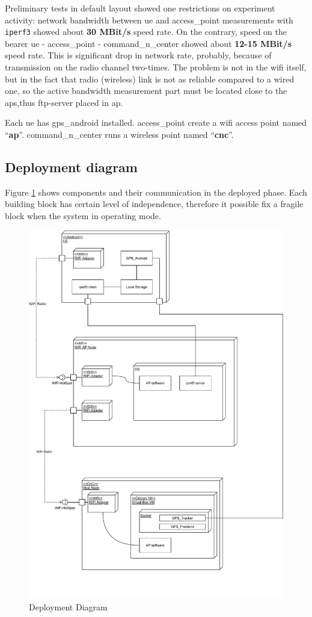 Preliminary tests in default layout showed one restrictions on experiment activity: network bandwidth
between \gls{ue} and \acrshort{access_point} measurements with \texttt{iperf3} showed about \textbf{30 MBit/s} speed rate. On the contrary, speed on the bearer \gls{ue} - \acrshort{access_point} - \gls{command_n_center} showed about \textbf{12-15 MBit/s} speed rate. This is significant drop in network rate, probably, because of transmission on the radio channel two-times. The problem  is not in the \gls{wifi} itself, but in the fact that radio (wireless) link is not as reliable compared to a wired one, so the active bandwidth measurement part must be located close to the \glspl{ap},thus \acrshort{ftp}-server placed in \gls{ap}.

Each \gls{ue} has   \gls{gps_android} installed. \Gls{access_point} create a \gls{wifi} access point named ``\textbf{ap}''.
\Gls{command_n_center} runs a wireless point named
``\textbf{cnc}''.

\subsection{Deployment diagram}\label{deployment-diagram}

Figure \ref{fig:deployment-diagram} shows components and their communication in the deployed phase. Each building block has certain level of independence, therefore it possible fix a fragile block when the system in operating mode.

\begin{figure}[H]
	\centering
	\includegraphics[width=0.7\linewidth, keepaspectratio]{images/Deployment Diagram-Deployment_Diagram.pdf}
	\caption{Deployment Diagram}
	\label{fig:deployment-diagram}
\end{figure}

